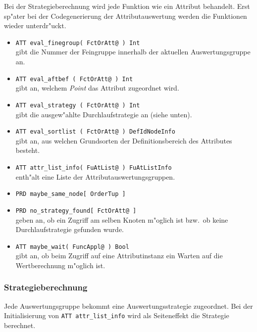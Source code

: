 Bei der Strategieberechnung wird jede Funktion wie ein Attribut behandelt.
Erst sp"ater bei der Codegenerierung der Attributauswertung werden die Funktionen
wieder unterdr"uckt.

\begin{itemize}
\item {\tt ATT eval\_finegroup( FctOrAtt@ ) Int}\\
gibt die Nummer der Feingruppe innerhalb der aktuellen Auswertungsgruppe an.

\item {\tt ATT eval\_aftbef   ( FctOrAtt@ ) Int}\\
gibt an, welchem {\it Point} das Attribut zugeordnet wird.

\item {\tt ATT eval\_strategy ( FctOrAtt@ ) Int}\\
gibt die ausgew"ahlte Durchlaufstrategie an (siehe unten).

\item {\tt ATT eval\_sortlist ( FctOrAtt@ ) DefIdNodeInfo}\\
gibt an, aus welchen Grundsorten der Definitionsbereich des Attributes besteht.

\item {\tt ATT attr\_list\_info( FuAtList@  ) FuAtListInfo}\\
enth"alt eine Liste der Attributauswertungsgruppen.

\item {\tt PRD maybe\_same\_node[ OrderTup ]}
\item {\tt PRD no\_strategy\_found[ FctOrAtt@ ]}\\
geben an, ob ein Zugriff am selben Knoten m"oglich ist bzw.\ ob keine Durchlaufstrategie
gefunden wurde.

\item {\tt ATT maybe\_wait( FuncAppl@ ) Bool}\\
gibt an, ob beim Zugriff auf eine Attributinstanz ein Warten auf
die Wertberechnung m"oglich ist.

\end{itemize}

\subsubsection{Strategieberechnung}

Jede Auswertungsgruppe bekommt eine Auswertungsstrategie zugeordnet.
Bei der Initialisierung von {\tt ATT  attr\_list\_info}
wird als Seiteneffekt die Strategie berechnet.

